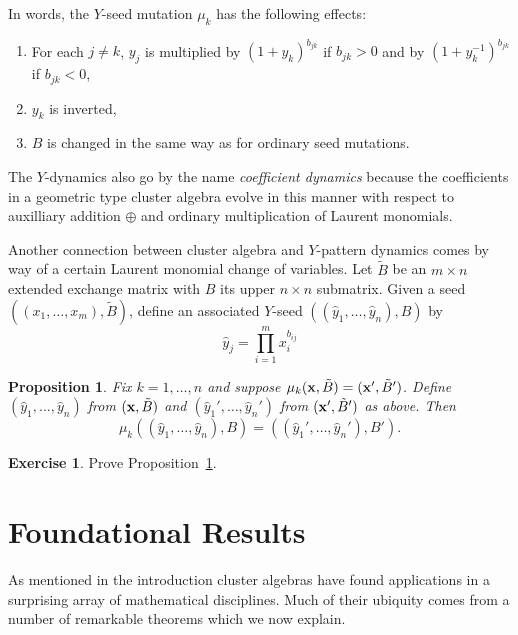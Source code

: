 \documentclass{amsart}
\newtheorem{proposition}[theorem]{Proposition}
\theoremstyle{definition}
\newtheorem{exercise}[theorem]{Exercise}
\theoremstyle{remark}
\numberwithin{equation}{section}
\newcommand{\x}{{\bf x}}
\begin{document}
	In words, the $Y$-seed mutation $\mu_k$ has the following effects:
	\begin{enumerate}
	\item For each $j \neq k$, $y_j$ is multiplied by $(1+y_k)^{b_{jk}}$ if $b_{jk}>0$ and by $(1+y_k^{-1})^{b_{jk}}$ if $b_{jk}<0$,
	\item $y_k$ is inverted,
	\item $B$ is changed in the same way as for ordinary seed mutations.
	\end{enumerate}
	The $Y$-dynamics also go by the name \emph{coefficient dynamics} because the coefficients in a geometric type cluster algebra evolve in this manner with respect to auxilliary addition $\oplus$ and ordinary multiplication of Laurent monomials.
	
	Another connection between cluster algebra and $Y$-pattern dynamics comes by way of a certain Laurent monomial change of variables.  Let $\tilde{B}$ be an $m \times n$ extended exchange matrix with $B$ its upper $n \times n$ submatrix.  Given a seed $((x_1,\ldots, x_m),\tilde{B})$, define an associated $Y$-seed $((\hat{y}_1,\ldots, \hat{y}_n),B)$ by
	\begin{displaymath}
	\hat{y}_j = \prod_{i=1}^m x_i^{b_{ij}}
	\end{displaymath}
	
	\begin{proposition}\label{prop:yhat mutations}
	Fix $k=1,\ldots, n$ and suppose $\mu_k(\x,\tilde{B}) = (\x',\tilde{B}')$.  Define $(\hat{y}_1,\ldots, \hat{y}_n)$ from $(\x,\tilde{B})$ and $(\hat{y}_1',\ldots, \hat{y}_n')$ from $(\x',\tilde{B}')$ as above.  Then 
	\begin{displaymath}
	\mu_k((\hat{y}_1,\ldots, \hat{y}_n), B) = ((\hat{y}_1',\ldots, \hat{y}_n'), B').
	\end{displaymath}
	\end{proposition}

  \begin{exercise}
    Prove Proposition~\ref{prop:yhat mutations}.
  \end{exercise}

\section{Foundational Results}\label{sec:basic_theorems}
  As mentioned in the introduction cluster algebras have found applications in a surprising array of mathematical disciplines.  Much of their ubiquity comes from a number of remarkable theorems which we now explain.  
\end{document}
